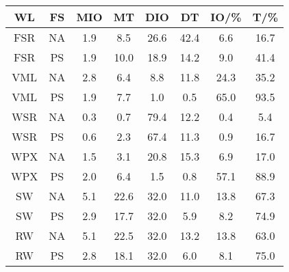 \begin{tabular}{c|c|cccc|cc}
\toprule
  WL &  FS & MIO &   MT &  DIO &   DT & IO/\% & T/\% \\
\midrule
 FSR &  NA & 1.9 &  8.5 & 26.6 & 42.4 &   6.6 & 16.7 \\
 FSR &  PS & 1.9 & 10.0 & 18.9 & 14.2 &   9.0 & 41.4 \\
 VML &  NA & 2.8 &  6.4 &  8.8 & 11.8 &  24.3 & 35.2 \\
 VML &  PS & 1.9 &  7.7 &  1.0 &  0.5 &  65.0 & 93.5 \\
 WSR &  NA & 0.3 &  0.7 & 79.4 & 12.2 &   0.4 &  5.4 \\
 WSR &  PS & 0.6 &  2.3 & 67.4 & 11.3 &   0.9 & 16.7 \\
 WPX &  NA & 1.5 &  3.1 & 20.8 & 15.3 &   6.9 & 17.0 \\
 WPX &  PS & 2.0 &  6.4 &  1.5 &  0.8 &  57.1 & 88.9 \\
  SW &  NA & 5.1 & 22.6 & 32.0 & 11.0 &  13.8 & 67.3 \\
  SW &  PS & 2.9 & 17.7 & 32.0 &  5.9 &   8.2 & 74.9 \\
  RW &  NA & 5.1 & 22.5 & 32.0 & 13.2 &  13.8 & 63.0 \\
  RW &  PS & 2.8 & 18.1 & 32.0 &  6.0 &   8.1 & 75.0 \\
\bottomrule
\end{tabular}
